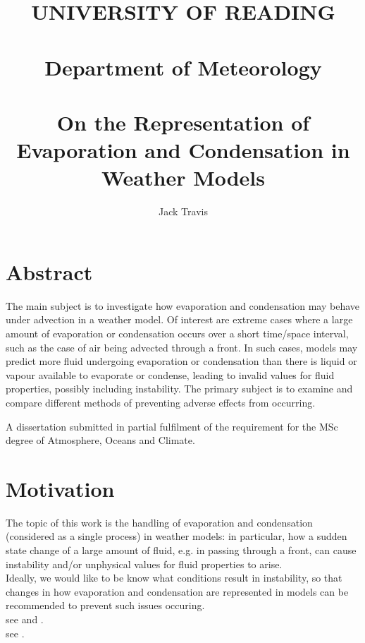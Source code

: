 \documentclass[11pt]{article}
\begin{document}
\thispagestyle{empty}
\title{UNIVERSITY OF READING\\
~\\
Department of Meteorology\\
~\\
On the Representation of Evaporation and Condensation in Weather Models}
\author{Jack Travis}
\maketitle

\section{Abstract}
The main subject is to investigate how evaporation and condensation may behave under advection in a weather model. Of interest are extreme cases where a large amount of evaporation or condensation occurs over a short time/space interval, such as the case of air being advected through a front. In such cases, models may predict more fluid undergoing evaporation or condensation than there is liquid or vapour available to evaporate or condense, leading to invalid values for fluid properties, possibly including instability. The primary subject is to examine and compare different methods of preventing adverse effects from occurring.

\null \vfill
A dissertation submitted in partial fulfilment of the requirement for the MSc degree of Atmosphere, Oceans and Climate.

\newpage
\tableofcontents

\newpage

\section{Motivation}
The topic of this work is the handling of evaporation and condensation (considered as a single process) in weather models: in particular, how a sudden state change of a large amount of fluid, e.g. in passing through a front, can cause instability and/or unphysical values for fluid properties to arise. \\
Ideally, we would like to be know what conditions result in instability, so that changes in how evaporation and condensation are represented in models can be recommended to prevent such issues occuring. \\
see \citet{Wilson2008} and \citet{Smith1990}. \\
see \citet{GS1990}. \\
\end{document}
